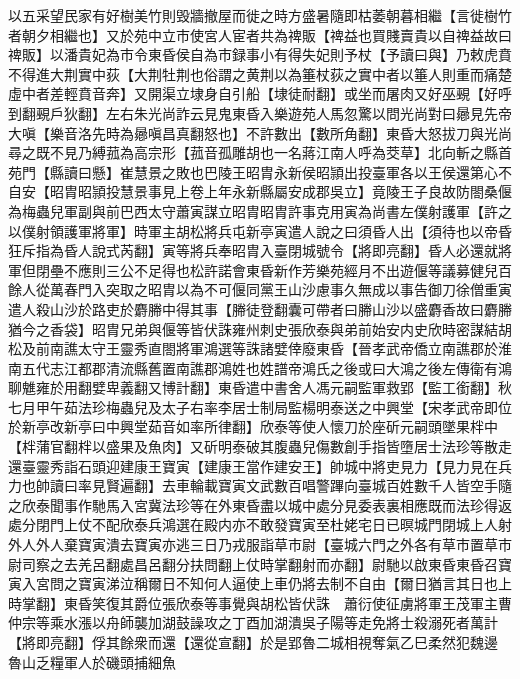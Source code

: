 以五采望民家有好樹美竹則毁牆撤屋而徙之時方盛暑隨即枯萎朝暮相繼【言徙樹竹者朝夕相繼也】又於苑中立市使宮人宦者共為禆販【禆益也買賤賣貴以自禆益故曰禆販】以潘貴妃為市令東昏侯自為市録事小有得失妃則予杖【予讀曰與】乃敕虎賁不得進大荆實中荻【大荆牡荆也俗謂之黄荆以為箠杖荻之實中者以箠人則重而痛楚虛中者差輕賁音奔】又開渠立埭身自引船【埭徒耐翻】或坐而屠肉又好巫覡【好呼到翻覡戶狄翻】左右朱光尚詐云見鬼東昏入樂遊苑人馬忽驚以問光尚對曰曏見先帝大嗔【樂音洛先時為曏嗔昌真翻怒也】不許數出【數所角翻】東昏大怒拔刀與光尚尋之既不見乃縛菰為高宗形【菰音孤雕胡也一名蔣江南人呼為茭草】北向斬之縣首苑門【縣讀曰懸】崔慧景之敗也巴陵王昭胄永新侯昭頴出投臺軍各以王侯還第心不自安【昭胄昭頴投慧景事見上卷上年永新縣屬安成郡吳立】竟陵王子良故防閤桑偃為梅蟲兒軍副與前巴西太守蕭寅謀立昭胄昭胄許事克用寅為尚書左僕射護軍【許之以僕射領護軍將軍】時軍主胡松將兵屯新亭寅遣人說之曰須昏人出【須待也以帝昏狂斥指為昏人說式芮翻】寅等將兵奉昭胄入臺閉城號令【將即亮翻】昏人必還就將軍但閉壘不應則三公不足得也松許諾會東昏新作芳樂苑經月不出遊偃等議募健兒百餘人從萬春門入突取之昭胄以為不可偃同黨王山沙慮事久無成以事告御刀徐僧重寅遣人殺山沙於路吏於麝幐中得其事【幐徒登翻囊可帶者曰幐山沙以盛麝香故曰麝幐猶今之香袋】昭胄兄弟與偃等皆伏誅雍州刺史張欣泰與弟前始安内史欣時密謀結胡松及前南譙太守王靈秀直閤將軍鴻選等誅諸嬖倖廢東昏【晉孝武帝僑立南譙郡於淮南五代志江都郡清流縣舊置南譙郡鴻姓也姓譜帝鴻氏之後或曰大鴻之後左傳衛有鴻聊魋雍於用翻嬖卑義翻又博計翻】東昏遣中書舍人馮元嗣監軍救郢【監工銜翻】秋七月甲午茹法珍梅蟲兒及太子右率李居士制局監楊明泰送之中興堂【宋孝武帝即位於新亭改新亭曰中興堂茹音如率所律翻】欣泰等使人懷刀於座斫元嗣頭墜果柈中【柈蒲官翻柈以盛果及魚肉】又斫明泰破其腹蟲兒傷數創手指皆墮居士法珍等散走還臺靈秀詣石頭迎建康王寶寅【建康王當作建安王】帥城中將吏見力【見力見在兵力也帥讀曰率見賢遍翻】去車輪載寶寅文武數百唱警蹕向臺城百姓數千人皆空手隨之欣泰聞事作馳馬入宮冀法珍等在外東昏盡以城中處分見委表裏相應既而法珍得返處分閉門上仗不配欣泰兵鴻選在殿内亦不敢發寶寅至杜姥宅日已暝城門閉城上人射外人外人棄寶寅潰去寶寅亦逃三日乃戎服詣草市尉【臺城六門之外各有草市置草市尉司察之去羌呂翻處昌呂翻分扶問翻上仗時掌翻射而亦翻】尉馳以啟東昏東昏召寶寅入宮問之寶寅涕泣稱爾日不知何人逼使上車仍將去制不自由【爾日猶言其日也上時掌翻】東昏笑復其爵位張欣泰等事覺與胡松皆伏誅　蕭衍使征虜將軍王茂軍主曹仲宗等乘水漲以舟師襲加湖鼓譟攻之丁酉加湖潰吳子陽等走免將士殺溺死者萬計【將即亮翻】俘其餘衆而還【還從宣翻】於是郢魯二城相視奪氣乙巳柔然犯魏邊　魯山乏糧軍人於磯頭捕細魚

